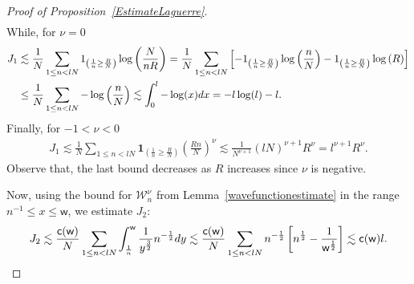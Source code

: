 \documentclass[11pt]{article}
\numberwithin{equation}{section}
\begin{document}
\begin{proof}[Proof of Proposition~\ref{EstimateLaguerre}]
\begin{gather*}
\end{gather*}
While, for $\nu=0$
\begin{align*}
J_1 & \lesssim \frac{1}{N} \sum_{1 \le n <lN}^{}\textbf{1}_{\left(\frac{1}{n}\ge \frac{R}{N}\right)} \log \left(\frac{N}{nR}\right)=\frac{1}{N}\sum_{1 \le n <lN}^{}\left[-\textbf{1}_{\left(\frac{1}{n}\ge \frac{R}{N}\right)} \log \left(\frac{n}{N}\right)-\textbf{1}_{\left(\frac{1}{n}\ge \frac{R}{N}\right)} \log \left(R\right)\right]\\
 &\le \frac{1}{N}\sum_{1 \le n <lN}^{}- \log \left(\frac{n}{N}\right) \lesssim \int_{0}^{l}-\log(x){\rm d}x=-l\log(l)-l.
\end{align*}
Finally, for $-1<\nu<0$
\begin{gather*}
J_1 \lesssim \frac{1}{N} \sum_{1 \le n <lN}^{}\textbf{1}_{\left(\frac{1}{n}\ge \frac{R}{N}\right)} \left(\frac{Rn}{N}\right)^\nu \lesssim \frac{1}{N^{\nu+1}}\left(lN\right)^{\nu+1}R^\nu=l^{\nu+1}R^\nu.
\end{gather*}
Observe that, the last bound decreases as $R$ increases since $\nu$ is negative.

Now, using the bound for $\mathcal{W}_n^{\nu}$ from Lemma~\ref{wavefunctionestimate} in the range $n^{-1} \le x \le \mathsf{w}$, we estimate $J_2$:
\begin{gather*}
J_2 \lesssim \frac{\mathsf{c}(\mathsf{w})}{N} \sum_{1 \le n < lN}^{} \int_{\frac{1}{n}}^{\mathsf{w}} \frac{1}{y^{\frac{3}{2}}}n^{-\frac{1}{2}}{\rm d}y \lesssim \frac{\mathsf{c}(\mathsf{w})}{N} \sum_{1 \le n < lN}^{}n^{-\frac{1}{2}} \left[n^{\frac{1}{2}}-\frac{1}{\mathsf{w}^{\frac{1}{2}}}\right] \lesssim \mathsf{c}(\mathsf{w})l.
\end{gather*}


\end{proof}
\end{document}
